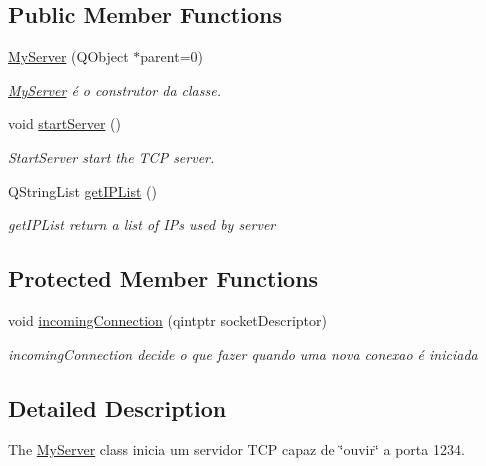 \subsection*{Public Member Functions}
\begin{DoxyCompactItemize}
\item 
\mbox{\hyperlink{class_my_server_ac9e5ca7b551a5df90d5b39260f7e5404}{My\+Server}} (Q\+Object $\ast$parent=0)
\begin{DoxyCompactList}\small\item\em \mbox{\hyperlink{class_my_server}{My\+Server}} é o construtor da classe. \end{DoxyCompactList}\item 
void \mbox{\hyperlink{class_my_server_a962f0e205a0aaf08b12d50d1315a8c90}{start\+Server}} ()
\begin{DoxyCompactList}\small\item\em Start\+Server start the T\+CP server. \end{DoxyCompactList}\item 
Q\+String\+List \mbox{\hyperlink{class_my_server_ac10d498dcc2b5d691f131f17b6602a59}{get\+I\+P\+List}} ()
\begin{DoxyCompactList}\small\item\em get\+I\+P\+List return a list of I\+Ps used by server \end{DoxyCompactList}\end{DoxyCompactItemize}
\subsection*{Protected Member Functions}
\begin{DoxyCompactItemize}
\item 
void \mbox{\hyperlink{class_my_server_a635c7a1e6817285ffb1a2a3842df010b}{incoming\+Connection}} (qintptr socket\+Descriptor)
\begin{DoxyCompactList}\small\item\em incoming\+Connection decide o que fazer quando uma nova conexao é iniciada \end{DoxyCompactList}\end{DoxyCompactItemize}


\subsection{Detailed Description}
The \mbox{\hyperlink{class_my_server}{My\+Server}} class inicia um servidor T\+CP capaz de \char`\"{}ouvir\char`\"{} a porta 1234. 

